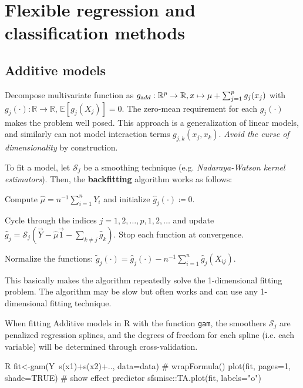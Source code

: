 \section{\Large Flexible regression and classification methods}\label{sec:flexible_regression_and_classification_methods}
\subsection{Additive models}%
\label{sub:additive_models}
\begin{sectionbox}\nospacing{}
  Decompose multivariate function as $g_{\textrm add}: \mathbb{R}^p\to\mathbb{R}, x\mapsto \mu + \sum_{j=1}^pg_j(x_j)$ with $g_j(\cdot): \mathbb{R}\to\mathbb{R}$, $\mathbb{E}[g_j(X_j)]=0$.
  The zero-mean requirement for each $g_j(\cdot)$ makes the problem well posed.
  This approach is a generalization of linear models, and similarly can not model interaction terms $g_{j,k}(x_j, x_k)$. \emph{Avoid the curse of dimensionality} by construction.
\end{sectionbox}
\begin{sectionbox}\nospacing{}
  To fit a model, let $\mathcal{S}_j$ be a smoothing technique (e.g. \emph{Nadaraya-Watson kernel estimators}).
  Then, the \textbf{backfitting} algorithm works as follows:
  \begin{itemizenosep}
    \item Compute $\hat \mu = n^{-1}\sum_{i=1}^n Y_i$ and initialize $\hat g_j(\cdot) \coloneqq 0$.
    \item Cycle through the indices $j = 1,2,\dots,p,1,2,\dots$ and update
      $\hat g_j=\mathcal{S}_j(\vec{Y}-\hat \mu\vec{1}-\sum_{k\neq j}\hat g_k)$.
      Stop each function at convergence.
    \item Normalize the functions: $\tilde g_j(\cdot) = \hat g_j(\cdot) - n^{-1}\sum_{i=1}^n\hat g_j(X_{ij})$.
  \end{itemizenosep}
  This basically makes the algorithm repeatedly solve the 1-dimensional fitting problem.
  The algorithm may be slow but often works and can use any 1-dimensional fitting technique.
\end{sectionbox}
\begin{sectionbox}\nospacing{}
  When fitting Additive models in R with the function \verb!gam!, the smoothers $\mathcal{S}_j$ are penalized regression splines, and the degrees of freedom for each spline (i.e. each variable) will be determined through cross-validation.

  \begin{mintlinebox}{R}
    fit<-gam(Y~s(x1)+s(x2)+.., data=data) # wrapFormula()
    plot(fit, pages=1, shade=TRUE) # show effect predictor
    sfsmisc::TA.plot(fit, labels="o")
  \end{mintlinebox}
\end{sectionbox}

